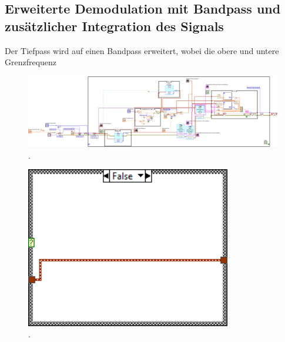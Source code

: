 \documentclass[
a4paper,
12pt,
pagesize,
ngerman
]{scrartcl}
\begin{document}
	
	
	\subsection{Erweiterte Demodulation mit Bandpass und zusätzlicher Integration des Signals}
	
	Der Tiefpass wird auf einen Bandpass erweitert, wobei die obere und untere Grenzfrequenz 
	
	\begin{figure}[H]
		\centering
		\includegraphics[width=1.0\textwidth]{EIRE2018Dateien/Tag4/OsziFMPM-Demod/mitBandpassUndIntegrationBilder/OsziPlusFMPMd}
		\caption{.}
	\end{figure}
	
	\begin{figure}[H]
		\centering
		\includegraphics[width=0.8\textwidth]{EIRE2018Dateien/Tag4/OsziFMPM-Demod/mitBandpassUndIntegrationBilder/OsziPlusFMPMd6} %
		\caption{.}
	\end{figure}
		
\end{document}
